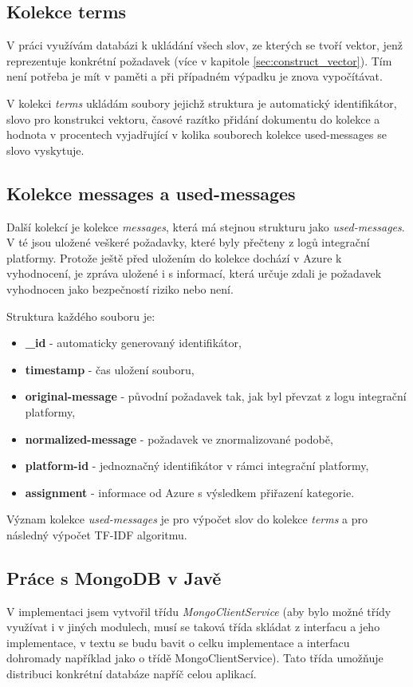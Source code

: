 \documentclass[thesis=M,czech]{FITthesis}[2012/10/20]
\begin{document}
	
	\subsection{Kolekce terms}
		V práci využívám databázi k ukládání všech slov, ze kterých se tvoří vektor, jenž reprezentuje konkrétní požadavek (více v kapitole \ref{sec:construct_vector}). Tím není potřeba je mít v paměti a při případném výpadku je znova vypočítávat.
	
		V kolekci \textit{terms} ukládám soubory jejichž struktura je automatický identifikátor, slovo pro konstrukci vektoru, časové razítko přidání dokumentu do kolekce a hodnota v procentech vyjadřující v kolika souborech kolekce used-messages se slovo vyskytuje.
	
	\subsection{Kolekce messages a used-messages}
		Další kolekcí je kolekce \textit{messages}, která má stejnou strukturu jako \textit{used-messages}. V té jsou uložené veškeré požadavky, které byly přečteny z logů integrační platformy. Protože ještě před uložením do kolekce dochází v Azure k vyhodnocení, je zpráva uložené i s informací, která určuje zdali je požadavek vyhodnocen jako bezpečností riziko nebo není. 
	
		Struktura každého souboru je: 
	
		\begin{itemize} 
			\item \textbf{\_id} - automaticky generovaný identifikátor,
			\item \textbf{timestamp} - čas uložení souboru,
			\item \textbf{original-message} - původní požadavek tak, jak byl převzat z logu integrační platformy,
			\item \textbf{normalized-message} - požadavek ve znormalizované podobě,
			\item \textbf{platform-id} - jednoznačný identifikátor v rámci integrační platformy,
			\item \textbf{assignment} - informace od Azure s výsledkem přiřazení kategorie. 	
		\end{itemize}
	
		Význam kolekce \textit{used-messages} je pro výpočet slov do kolekce \textit{terms} a pro následný výpočet TF-IDF algoritmu.

	\subsection{Práce s MongoDB v Javě}
		V implementaci jsem vytvořil třídu \textit{MongoClientService} (aby bylo možné třídy využívat i v jiných modulech, musí se taková třída skládat z interfacu a jeho implementace, v textu se budu bavit o celku implementace a interfacu dohromady například jako o třídě MongoClientService). Tato třída umožňuje distribuci konkrétní databáze napříč celou aplikací. 
	
\end{document}
